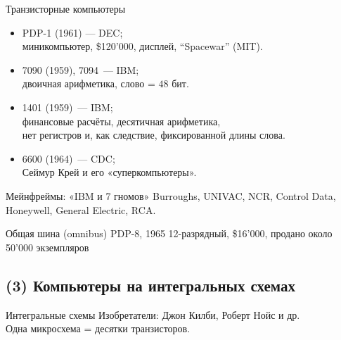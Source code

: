 \begin{frame}{Транзисторные компьютеры}
\pause
\begin{itemize}[<+->]
    \item PDP-1 (1961) — DEC;\\
        {\small миникомпьютер, \$120'000, дисплей, “Spacewar” (MIT).}

    \item 7090 (1959), 7094~— IBM;\\
        {\small двоичная арифметика, слово = $48$ бит.}

    \item 1401 (1959)~— IBM;\\
        {\small финансовые расчёты, десятичная арифметика,\\
        нет регистров и, как следствие, фиксированной длины слова.}

    \item 6600 (1964)~— CDC;\\
        {\small Сеймур Крей и его «суперкомпьютеры».}
\end{itemize}

\pause
\begin{block}{Мейнфреймы: «IBM и 7 гномов»}
Burroughs, UNIVAC, NCR, Control Data, Honeywell, General Electric, RCA.
\end{block}
\end{frame}

\begin{frame}{Общая шина (omnibus) PDP-8, 1965}
12-разрядный, \$16'000, продано около 50'000 экземпляров
\end{frame}

\subsection {(3) Компьютеры на интегральных схемах}

\begin{frame}{Интегральные схемы}
\vspace{-.3cm}
Изобретатели: Джон Килби, Роберт Нойс и др.\\
Одна микросхема = десятки транзисторов.
\end{frame}

